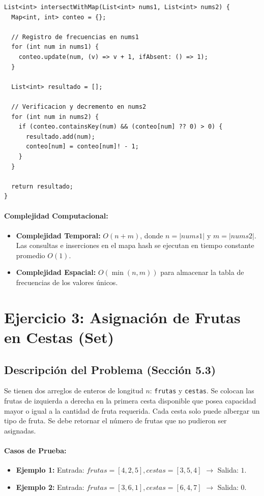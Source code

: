 \documentclass[12pt,a4paper]{article}
\begin{document}
\begin{lstlisting}[caption={Solución al Ejercicio 2 utilizando Map en Dart}]
List<int> intersectWithMap(List<int> nums1, List<int> nums2) {
  Map<int, int> conteo = {};

  // Registro de frecuencias en nums1
  for (int num in nums1) {
    conteo.update(num, (v) => v + 1, ifAbsent: () => 1);
  }

  List<int> resultado = [];

  // Verificacion y decremento en nums2
  for (int num in nums2) {
    if (conteo.containsKey(num) && (conteo[num] ?? 0) > 0) {
      resultado.add(num);
      conteo[num] = conteo[num]! - 1;
    }
  }

  return resultado;
}
\end{lstlisting}

\paragraph{Complejidad Computacional:}
\begin{itemize}
    \item \textbf{Complejidad Temporal:} $O(n + m)$, donde $n = |nums1|$ y $m = |nums2|$. Las consultas e inserciones en el mapa hash se ejecutan en tiempo constante promedio $O(1)$.
    \item \textbf{Complejidad Espacial:} $O(\min(n, m))$ para almacenar la tabla de frecuencias de los valores únicos.
\end{itemize}

\section{Ejercicio 3: Asignación de Frutas en Cestas (Set)}

\subsection{Descripción del Problema (Sección 5.3)}
Se tienen dos arreglos de enteros de longitud $n$: \texttt{frutas} y \texttt{cestas}. Se colocan las frutas de izquierda a derecha en la primera cesta disponible que posea capacidad mayor o igual a la cantidad de fruta requerida. Cada cesta solo puede albergar un tipo de fruta. Se debe retornar el número de frutas que no pudieron ser asignadas.

\paragraph{Casos de Prueba:}
\begin{itemize}
    \item \textbf{Ejemplo 1:} Entrada: $frutas = [4,2,5], cestas = [3,5,4]$ $\rightarrow$ Salida: $1$.
    \item \textbf{Ejemplo 2:} Entrada: $frutas = [3,6,1], cestas = [6,4,7]$ $\rightarrow$ Salida: $0$.
\end{itemize}
\end{document}
